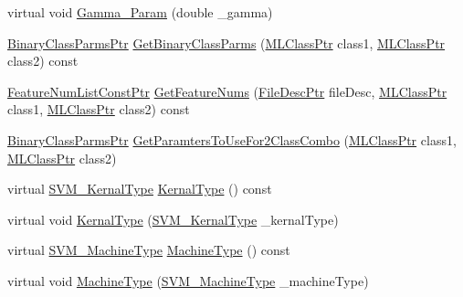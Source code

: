 \begin{DoxyCompactItemize}
virtual void \hyperlink{class_k_k_m_l_l_1_1_model_param_old_s_v_m_a698f76004969090d5a05f3be74f78e40}{Gamma\+\_\+\+Param} (double \+\_\+gamma)
\item 
\hyperlink{namespace_k_k_m_l_l_aca399c0744e11553270ffaca507cfee7}{Binary\+Class\+Parms\+Ptr} \hyperlink{class_k_k_m_l_l_1_1_model_param_old_s_v_m_af656887dd0cd20436301a6a6c1528bb2}{Get\+Binary\+Class\+Parms} (\hyperlink{namespace_k_k_m_l_l_ac272393853d59e72e8456f14cd6d8c23}{M\+L\+Class\+Ptr} class1, \hyperlink{namespace_k_k_m_l_l_ac272393853d59e72e8456f14cd6d8c23}{M\+L\+Class\+Ptr} class2) const 
\item 
\hyperlink{namespace_k_k_m_l_l_a81284b0a14973267260023f9a72da94a}{Feature\+Num\+List\+Const\+Ptr} \hyperlink{class_k_k_m_l_l_1_1_model_param_old_s_v_m_a0bb8767cf981a3d9ffa6690ba0698218}{Get\+Feature\+Nums} (\hyperlink{namespace_k_k_m_l_l_aa0d0b6ab4ec18868a399b8455b05d914}{File\+Desc\+Ptr} file\+Desc, \hyperlink{namespace_k_k_m_l_l_ac272393853d59e72e8456f14cd6d8c23}{M\+L\+Class\+Ptr} class1, \hyperlink{namespace_k_k_m_l_l_ac272393853d59e72e8456f14cd6d8c23}{M\+L\+Class\+Ptr} class2) const 
\item 
\hyperlink{namespace_k_k_m_l_l_aca399c0744e11553270ffaca507cfee7}{Binary\+Class\+Parms\+Ptr} \hyperlink{class_k_k_m_l_l_1_1_model_param_old_s_v_m_a615ae5238b2b7104b37e535cfe722f49}{Get\+Paramters\+To\+Use\+For2\+Class\+Combo} (\hyperlink{namespace_k_k_m_l_l_ac272393853d59e72e8456f14cd6d8c23}{M\+L\+Class\+Ptr} class1, \hyperlink{namespace_k_k_m_l_l_ac272393853d59e72e8456f14cd6d8c23}{M\+L\+Class\+Ptr} class2)
\item 
virtual \hyperlink{namespace_k_k_m_l_l_a14bbc982261fe6adeaf682c543ef9569}{S\+V\+M\+\_\+\+Kernal\+Type} \hyperlink{class_k_k_m_l_l_1_1_model_param_old_s_v_m_aba7be616bb7c9e815241a371bdbdea1c}{Kernal\+Type} () const 
\item 
virtual void \hyperlink{class_k_k_m_l_l_1_1_model_param_old_s_v_m_a486f1b317acc08c51798838cf0971f29}{Kernal\+Type} (\hyperlink{namespace_k_k_m_l_l_a14bbc982261fe6adeaf682c543ef9569}{S\+V\+M\+\_\+\+Kernal\+Type} \+\_\+kernal\+Type)
\item 
virtual \hyperlink{namespace_k_k_m_l_l_ad917464bc631109a3021cf02cd27af9a}{S\+V\+M\+\_\+\+Machine\+Type} \hyperlink{class_k_k_m_l_l_1_1_model_param_old_s_v_m_ad9149ba2f6ee796890b7f210df9315b0}{Machine\+Type} () const 
\item 
virtual void \hyperlink{class_k_k_m_l_l_1_1_model_param_old_s_v_m_af362c397c304cdce5f13912c5c4bb61f}{Machine\+Type} (\hyperlink{namespace_k_k_m_l_l_ad917464bc631109a3021cf02cd27af9a}{S\+V\+M\+\_\+\+Machine\+Type} \+\_\+machine\+Type)

\end{DoxyCompactItemize}
